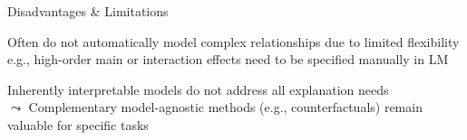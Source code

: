\documentclass[10pt,compress,t,notes=noshow,xcolor=table]{beamer}
\begin{document}
\begin{framev}[align=top]{Disadvantages \& Limitations}
\spacer[0.25]
\begin{itemizeM}
\item<3->
Often do not automatically model complex relationships due to limited flexibility %
\\
e.g., high-order main or interaction effects need to be specified manually in LM
\item<4-> Inherently interpretable models do not address all explanation needs\\
$\leadsto$ Complementary model-agnostic methods (e.g., counterfactuals) remain valuable for specific tasks
\end{itemizeM}
\end{framev}
\end{document}
